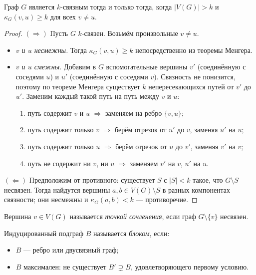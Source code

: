 \begin{Theorem}{}{}
	Граф $G$ является $k$-связным тогда и только тогда, когда
	$|V(G)| > k$ и $\kappa_G(v, u) \geq k$ для всех $v \neq u$.
\end{Theorem}
\begin{proof}
	$(\Rightarrow)$
	Пусть $G$ $k$-связен. Возьмём произвольные $v \neq u$.
	
	\begin{itemize}
		\item \textit{$v$ и $u$ несмежны.} Тогда $\kappa_G(v,u) \geq k$
		непосредственно из теоремы Менгера.
		
		\item \textit{$v$ и $u$ смежны.} Добавим в $G$ вспомогательные
		вершины $v'$ (соединённую с соседями $u$) и $u'$
		(соединённую с соседями $v$). Связность не понизится,
		поэтому по теореме Менгера существует $k$
		непересекающихся путей от $v'$ до $u'$.
		Заменим каждый такой путь на путь между $v$ и $u$:
		\begin{enumerate}
			\item путь содержит $v$ и $u$
			$\Rightarrow$ заменяем на ребро $\{v,u\}$;
			\item путь содержит только $v$
			$\Rightarrow$ берём отрезок от $u'$ до $v$,
			заменяя $u'$ на $u$;
			\item путь содержит только $u$
			$\Rightarrow$ берём отрезок от $u$ до $v'$,
			заменяя $v'$ на $v$;
			\item путь не содержит ни $v$, ни $u$
			$\Rightarrow$ заменяем $v'$ на $v$, $u'$ на $u$.
		\end{enumerate}
	\end{itemize}
	
	$(\Leftarrow)$
	Предположим от противного: существует $S$ с $|S| < k$ такое,
	что $G \setminus S$ несвязен. Тогда найдутся вершины
	$a, b \in V(G) \setminus S$ в разных компонентах связности;
	они несмежны и $\kappa_G(a,b) < k$ --- противоречие.
\end{proof}

\begin{Definition}{}{}
	Вершина $v \in V(G)$ называется \emph{точкой сочленения},
	если граф $G \setminus \{v\}$ несвязен.
\end{Definition}

\begin{Definition}{}{}
	Индуцированный подграф $B$ называется \emph{блоком}, если:
	\begin{itemize}
		\item $B$ --- ребро или двусвязный граф;
		\item $B$ максимален: не существует $B' \supsetneq B$,
		удовлетворяющего первому условию.
	\end{itemize}
\end{Definition}


